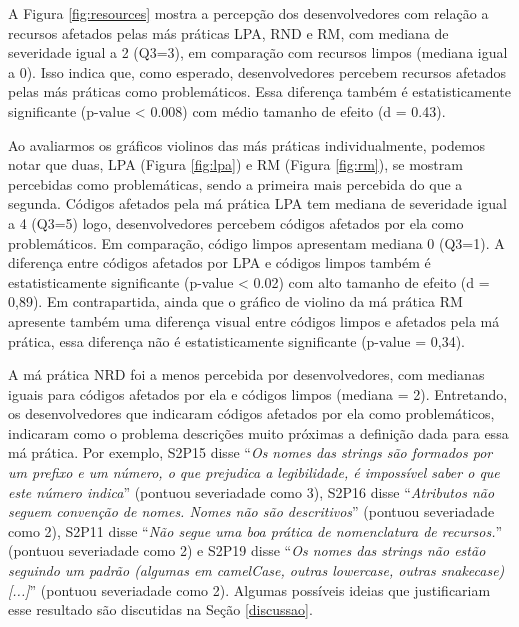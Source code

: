 A Figura \ref{fig:resources} mostra a percepção dos desenvolvedores com relação a recursos afetados pelas más práticas LPA, RND e RM, com mediana de severidade igual a 2 (Q3=3), em comparação com recursos limpos (mediana igual a 0). Isso indica que, como esperado, desenvolvedores percebem recursos afetados pelas más práticas como problemáticos. Essa diferença também é estatisticamente significante (p-value < 0.008) com médio tamanho de efeito (d = 0.43).


Ao avaliarmos os gráficos violinos das más práticas individualmente, podemos notar que duas, LPA (Figura \ref{fig:lpa}) e RM (Figura \ref{fig:rm}), se mostram percebidas como problemáticas, sendo a primeira mais percebida do que a segunda. Códigos afetados pela má prática LPA tem mediana de severidade igual a 4 (Q3=5) logo, desenvolvedores percebem códigos afetados por ela como problemáticos. Em comparação, código limpos apresentam mediana 0 (Q3=1). A diferença entre códigos afetados por LPA e códigos limpos também é estatisticamente significante (p-value < 0.02) com alto tamanho de efeito (d = 0,89). Em contrapartida, ainda que o gráfico de violino da má prática RM apresente também uma diferença visual entre códigos limpos e afetados pela má prática, essa diferença não é estatisticamente significante (p-value = 0,34).

A má prática NRD foi a menos percebida por desenvolvedores, com medianas iguais para códigos afetados por ela e códigos limpos (mediana = 2). Entretando, os desenvolvedores que indicaram códigos afetados por ela como problemáticos, indicaram como o problema descrições muito próximas a definição dada para essa má prática. Por exemplo, S2P15 disse ``\textit{Os nomes das strings são formados por um prefixo e um número, o que prejudica a legibilidade, é impossível saber o que este número indica}'' (pontuou severiadade como 3), S2P16 disse ``\textit{Atributos não seguem convenção de nomes. Nomes não são descritivos}'' (pontuou severiadade como 2), S2P11 disse ``\textit{Não segue uma boa prática de nomenclatura de recursos.}'' (pontuou severiadade como 2) e S2P19 disse ``\textit{Os nomes das strings não estão seguindo um padrão (algumas em camelCase, outras lowercase, outras snakecase) [...]}'' (pontuou severiadade como 2). Algumas possíveis ideias que justificariam esse resultado são discutidas na Seção \ref{discussao}. \\

